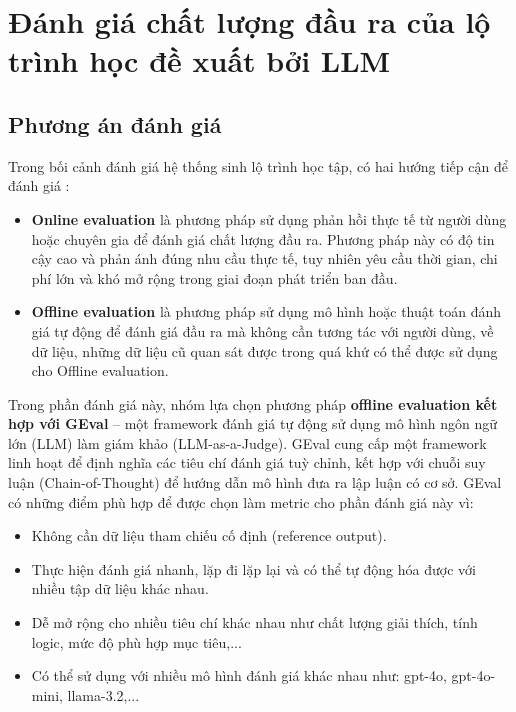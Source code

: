 
\section{Đánh giá chất lượng đầu ra của lộ trình học đề xuất bởi LLM}

\subsection{Phương án đánh giá}
Trong bối cảnh đánh giá hệ thống sinh lộ trình học tập, có hai hướng tiếp cận để đánh giá \cite{zhang2020new}:
\begin{itemize}
    \item \textbf{Online evaluation} là phương pháp sử dụng phản hồi thực tế từ người dùng hoặc chuyên gia để đánh giá chất lượng đầu ra. Phương pháp này có độ tin cậy cao và phản ánh đúng nhu cầu thực tế, tuy nhiên yêu cầu thời gian, chi phí lớn và khó mở rộng trong giai đoạn phát triển ban đầu.
    \item \textbf{Offline evaluation} là phương pháp sử dụng mô hình hoặc thuật toán đánh giá tự động để đánh giá đầu ra mà không cần tương tác với người dùng, về dữ liệu, những dữ liệu cũ quan sát được trong quá khứ có thể được sử dụng cho Offline evaluation.
\end{itemize}
Trong phần đánh giá này, nhóm lựa chọn phương pháp \textbf{offline evaluation kết hợp với GEval} – một framework đánh giá tự động sử dụng mô hình ngôn ngữ lớn (LLM) làm giám khảo (LLM-as-a-Judge)\cite{liu2023gevalnlgevaluationusing}. GEval cung cấp một framework linh hoạt để định nghĩa các tiêu chí đánh giá tuỳ chỉnh, kết hợp với chuỗi suy luận (Chain-of-Thought) để hướng dẫn mô hình đưa ra lập luận có cơ sở. GEval có những điểm phù hợp để được chọn làm metric cho  phần đánh giá này vì:
\begin{itemize}
    \item Không cần dữ liệu tham chiếu cố định (reference output).
    \item Thực hiện đánh giá nhanh, lặp đi lặp lại và có thể tự động hóa được với nhiều tập dữ liệu khác nhau.
    \item Dễ mở rộng cho nhiều tiêu chí khác nhau như chất lượng giải thích, tính logic, mức độ phù hợp mục tiêu,...
    \item Có thể sử dụng với nhiều mô hình đánh giá khác nhau như: gpt-4o, gpt-4o-mini, llama-3.2,...
\end{itemize}

